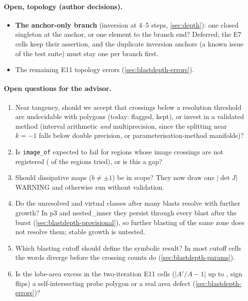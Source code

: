 \documentclass[11pt,a4paper]{article}
\newcommand{\code}[1]{\texttt{#1}}
\begin{document}
\paragraph{Open, topology (author decisions).}
\begin{itemize}[leftmargin=*]
\item \textbf{The anchor-only branch} (inversion at 4--5 steps,
  \cref{sec:depth}): one closed singleton at the anchor, or one element to the
  branch end? Deferred; the E7 cells keep their assertion, and the duplicate
  inversion anchors (a known issue of the test suite) must stay one per
  branch first.
\item The remaining E11 topology errors (\cref{sec:blastdepth-errors}).
\end{itemize}

\paragraph{Open questions for the advisor.}
\begin{enumerate}[leftmargin=*]
\item Near tangency, should we accept that crossings below a resolution
  threshold are undecidable with polygons (today: flagged, kept), or invest
  in a validated method (interval arithmetic \emph{and} multiprecision, since
  the splitting near $k=-1$ falls below double precision, or
  parameterisation-method manifolds)?
\item Is \code{image\_of} expected to fail for regions whose image crossings
  are not registered (\NumArrImageMissing{} of the regions tried), or is
  this a gap?
\item Should dissipative maps ($b\ne\pm1$) be in scope? They now draw one
  $|\det J|$ WARNING and otherwise run without validation.
\item Do the unresolved and virtual classes after many blasts resolve with
  further growth? In p3 and nested\_inner they persist through every blast
  after the burst (\cref{sec:blastdepth-provisional}), so further blasting of
  the same zone does not resolve them; stable growth is untested.
\item Which blasting cutoff should define the symbolic result? In most
  cutoff cells the words diverge before the crossing counts do
  (\cref{sec:blastdepth-params}).
\item Is the lobe-area excess in the two-iteration E11 cells
  ($|A'/A-1|$ up to \NumDeepLobeRatioMax, \NumDeepLobeSignFlips{} sign
  flips) a self-intersecting probe polygon or a real area defect
  (\cref{sec:blastdepth-errors})?
\end{enumerate}
\end{document}
